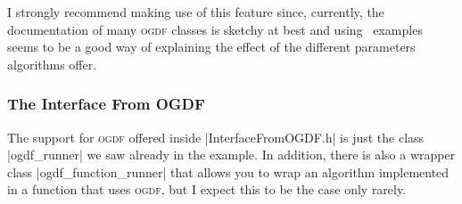 I strongly recommend making use of this feature since, currently, the
documentation of many \textsc{ogdf} classes is sketchy at best and using
\tikzname\ examples seems to be a good way of explaining the effect of the
different parameters algorithms offer.


\subsubsection{The Interface From OGDF}

The support for \textsc{ogdf} offered inside |InterfaceFromOGDF.h| is just the
class |ogdf_runner| we saw already in the example. In addition, there is also a
wrapper class |ogdf_function_runner| that allows you to wrap an algorithm
implemented in a function that uses \textsc{ogdf}, but I expect this to be the
case only rarely.
